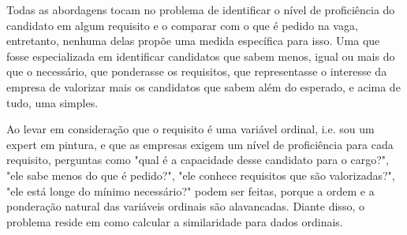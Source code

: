\documentclass[preprint,12pt]{elsarticle}
\begin{document}


Todas as abordagens tocam no problema de identificar o nível de proficiência do candidato em algum requisito e o comparar com o que é pedido na vaga, entretanto, nenhuma delas propõe uma medida específica para isso. Uma que fosse especializada em identificar candidatos que sabem menos, igual ou mais do que o necessário, que ponderasse os requisitos, que representasse o interesse da empresa de valorizar mais os candidatos que sabem além do esperado, e acima de tudo, uma simples.




Ao levar em consideração que o requisito é uma variável ordinal, i.e. sou um expert em pintura, e que as empresas exigem um nível de proficiência para cada requisito, perguntas como "qual é a capacidade desse candidato para o cargo?", "ele sabe menos do que é pedido?", "ele conhece requisitos que são valorizadas?", "ele está longe do mínimo necessário?" podem ser feitas, porque a ordem e a ponderação natural das variáveis ordinais são alavancadas. Diante disso, o problema reside em como calcular a similaridade para dados ordinais.



\end{document}
